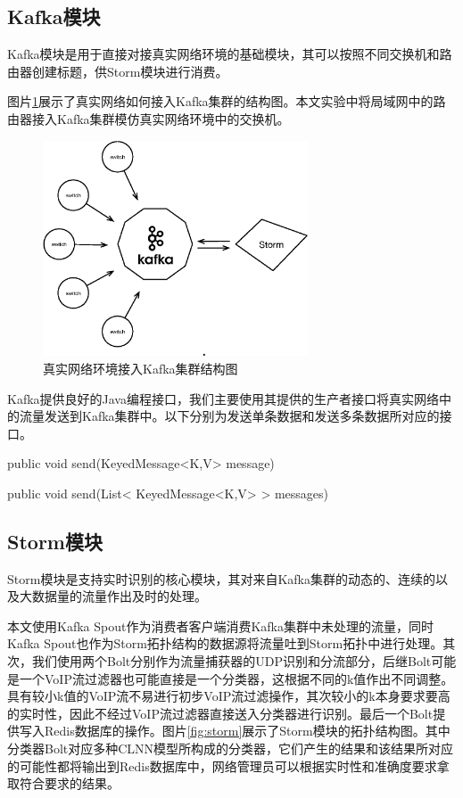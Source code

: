 \subsection{Kafka模块}
Kafka模块是用于直接对接真实网络环境的基础模块，其可以按照不同交换机和路由器创建标题，供Storm模块进行消费。

图片\ref{fig:kafka}展示了真实网络如何接入Kafka集群的结构图。本文实验中将局域网中的路由器接入Kafka集群模仿真实网络环境中的交换机。

\begin{figure}[htp]
\begin{center}
\includegraphics[width=0.7\textwidth]{figures/kafka.eps}
\caption{真实网络环境接入Kafka集群结构图}\label{fig:kafka}
\end{center}
\end{figure}

Kafka提供良好的Java编程接口，我们主要使用其提供的生产者接口将真实网络中的流量发送到Kafka集群中。以下分别为发送单条数据和发送多条数据所对应的接口。

\begin{center}
public void send(KeyedMessage<K,V> message) 
\end{center}

\begin{center}
public void send(List< KeyedMessage<K,V> > messages) 
\end{center}

\subsection{Storm模块}
Storm模块是支持实时识别的核心模块，其对来自Kafka集群的动态的、连续的以及大数据量的流量作出及时的处理。

本文使用Kafka Spout作为消费者客户端消费Kafka集群中未处理的流量，同时Kafka Spout也作为Storm拓扑结构的数据源将流量吐到Storm拓扑中进行处理。其次，我们使用两个Bolt分别作为流量捕获器的UDP识别和分流部分，后继Bolt可能是一个VoIP流过滤器也可能直接是一个分类器，这根据不同的k值作出不同调整。具有较小k值的VoIP流不易进行初步VoIP流过滤操作，其次较小的k本身要求要高的实时性，因此不经过VoIP流过滤器直接送入分类器进行识别。最后一个Bolt提供写入Redis数据库的操作。图片\ref{fig:storm}展示了Storm模块的拓扑结构图。其中分类器Bolt对应多种CLNN模型所构成的分类器，它们产生的结果和该结果所对应的可能性都将输出到Redis数据库中，网络管理员可以根据实时性和准确度要求拿取符合要求的结果。

